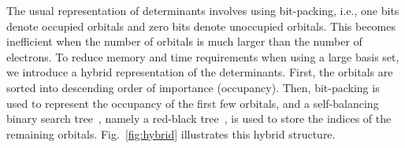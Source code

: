 The usual representation of determinants involves using bit-packing, i.e., one bits denote occupied orbitals
and zero bits denote unoccupied orbitals.  This becomes inefficient when the number of orbitals is much
larger than the number of electrons.
To reduce memory and time requirements when using a large basis set, we introduce a hybrid representation of the determinants.
First, the orbitals are sorted into descending order of importance (occupancy).
Then, bit-packing is used to represent the occupancy of the first few orbitals, and a self-balancing binary search tree~\cite{wiki:binarysearchtree}, namely a red-black tree~\cite{wiki:redblacktree}, is used to store the indices of the remaining orbitals.
Fig.~\ref{fig:hybrid} illustrates this hybrid structure.


